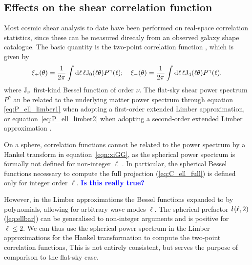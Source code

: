 \documentclass[fleqn,usenatbib]{mnras} %
\newcommand{\ellbar}{\hbox{\it \l}\,}
\newcommand{\mk}[1]{{\bf\textcolor{blue}{#1}}}
\begin{document}
\subsection{Effects on the shear correlation function}
\label{sec:comp_xi}



Most cosmic shear analysis to date have been performed on real-space
correlation statistics, since these can be measured direcaly from an observed
galaxy shape catalogue. The basic quantity is the two-point correlation
function \citep{1991ApJ...370....1M}, which is given by
%
\begin{align}
  \xi_+(\theta) 
  = \frac 1 {2\pi} \int {\rm d} \ell \, \ell {\rm J}_0(\ell
   \theta)
  P^\gamma(\ell);
  \quad
   \xi_-(\theta)
  = \frac 1 {2\pi} \int
   {\rm d} \ell \, \ell {\rm J}_4(\ell \theta)
  P^\gamma(\ell).
   \label{eqn:xiGG}
\end{align}
%
where ${\rm J}_\nu$ first-kind Bessel function of order $\nu$. The flat-sky
shear power spectrum $P^\gamma$ an be related to the underlying matter power
spectrum through equation \ref{eq:P_ell_limber1} when adopting a first-order
extended Limber approximation, or equation~\ref{eq:P_ell_limber2} when adopting
a second-order extended Limber approximation \citep[for more details see][and
references therein]{1991ApJ...370....1M,1992ApJ...388..272K,
BS01}.

On a sphere, correlation functions cannot be related to the power spectrum by a
Hankel transform in equation~\ref{eqn:xiGG}, as the spherical power spectrum is
formally not defined for non-integer $\ell$ \citep[see][for alternative
spherical-sky formulae for the two-point correlation
function]{2005PhRvD..72b3516C}. In particular, the spherical Bessel functions
necessary to compute the full projection (\ref{eq:C_ell_full}) is defined only
for integer order $\ell$. \mk{Is this really true?}

However, in the Limber approximations the Bessel functions expanded to by
polynomials, allowing for arbitrary wave modes $\ell$. The spherical prefactor
$\ellbar(\ell, 2)$ (\ref{eq:ellbar}) can be generalised to non-integer
arguments and is positive for $\ell \le 2$. We can thus use the spherical power
spectrum in the Limber approximations for the Hankel transformation to compute
the two-point correlation functions, This is not entirely consistent, but
serves the purpose of comparison to the flat-sky case.
\end{document}
